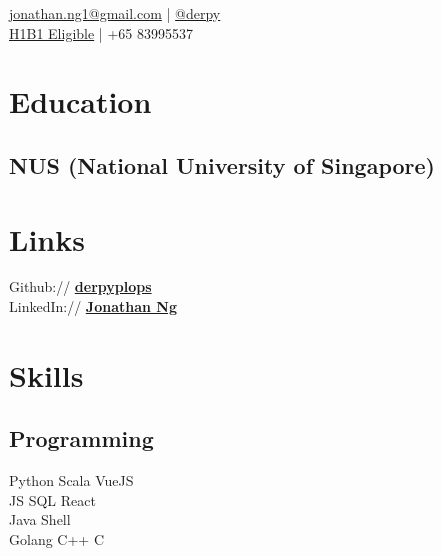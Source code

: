 \documentclass[]{deedy-resume-openfont}
\begin{document}
%
%
\lastupdated

%
%
 { \href{mailto:jonathan.ng1@gmail.com
}{jonathan.ng1@gmail.com} | \href{http://t.me/derpy/}{@derpy}\\
\href{http://www.h1b1.com/practices/h-1b1-visa-for-chileans-singaporeans/}{H1B1 Eligible}
| +65 83995537
\\
}

%
%

\begin{minipage}[t]{0.29\textwidth}


\section{Education} 

\subsection{NUS (National University of Singapore)}
\sectionsep


\section{Links} 
Github:// \href{https://github.com/derpyplops}{\bf derpyplops} \\
LinkedIn://  \href{https://www.linkedin.com/in/jonathan-ng-7061a3162/}{\bf Jonathan Ng} \\




\section{Skills}
\subsection{Programming}
Python \textbullet{} Scala \textbullet{} VueJS  \\ 
JS  \textbullet{} SQL \textbullet{} React\\
\vspace{3mm}
Java\textbullet{} Shell \\ Golang \textbullet{} C++ \textbullet{} C \\
\sectionsep


\end{minipage}
\end{document}
